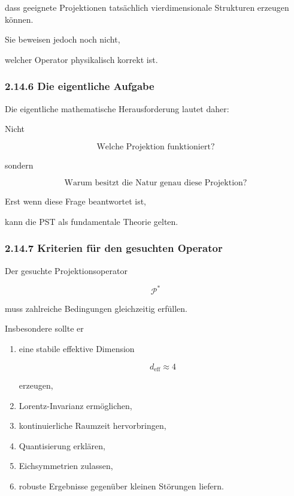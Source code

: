 dass geeignete Projektionen tatsächlich vierdimensionale Strukturen erzeugen können.

Sie beweisen jedoch noch nicht,

welcher Operator physikalisch korrekt ist.


\subsubsection*{2.14.6 Die eigentliche Aufgabe}

Die eigentliche mathematische Herausforderung lautet daher:

\begin{center}

\Large

Nicht

\[
\boxed{\text{Welche Projektion funktioniert?}}
\]

sondern

\[
\boxed{\text{Warum besitzt die Natur genau diese Projektion?}}
\]

\end{center}

Erst wenn diese Frage beantwortet ist,

kann die PST als fundamentale Theorie gelten.


\subsubsection*{2.14.7 Kriterien für den gesuchten Operator}

Der gesuchte Projektionsoperator

\[
\mathcal P^\ast
\]

muss zahlreiche Bedingungen gleichzeitig erfüllen.

Insbesondere sollte er

\begin{enumerate}

\item eine stabile effektive Dimension

\[
d_{\mathrm{eff}}
\approx
4
\]

erzeugen,

\item Lorentz-Invarianz ermöglichen,

\item kontinuierliche Raumzeit hervorbringen,

\item Quantisierung erklären,

\item Eichsymmetrien zulassen,

\item robuste Ergebnisse gegenüber kleinen Störungen liefern.

\end{enumerate}

